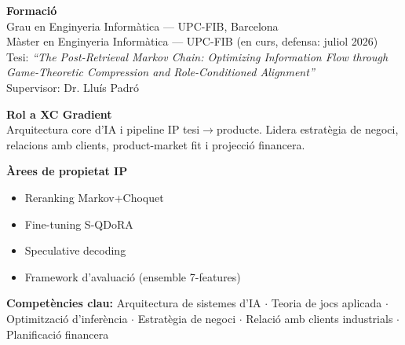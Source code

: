 \documentclass[11pt,a4paper]{article}
\begin{document}
\begin{profilebox}[title={\large\bfseries\color{dark} Oriol Farrés i Vilar \hfill \normalsize CEO / CFO}]

\begin{minipage}[t]{0.65\textwidth}
\textbf{Formació}\\
Grau en Enginyeria Informàtica --- UPC-FIB, Barcelona\\
Màster en Enginyeria Informàtica --- UPC-FIB (en curs, defensa: juliol 2026)\\
\small Tesi: \textit{``The Post-Retrieval Markov Chain: Optimizing Information Flow through Game-Theoretic Compression and Role-Conditioned Alignment''}\\
Supervisor: Dr. Lluís Padró

\vspace{0.5em}
\textbf{Rol a XC Gradient}\\
Arquitectura core d'IA i pipeline IP tesi$\rightarrow$producte. Lidera estratègia de negoci, relacions amb clients, product-market fit i projecció financera.
\end{minipage}%
\hfill%
\begin{minipage}[t]{0.32\textwidth}
\small
\textbf{Àrees de propietat IP}
\begin{itemize}[leftmargin=0.8em,itemsep=1pt,topsep=2pt]
\item Reranking Markov+Choquet
\item Fine-tuning S-QDoRA
\item Speculative decoding
\item Framework d'avaluació (ensemble 7-features)
\end{itemize}
\end{minipage}

\vspace{0.5em}
\begin{skillbox}
\small\textbf{Competències clau:} Arquitectura de sistemes d'IA $\cdot$ Teoria de jocs aplicada $\cdot$ Optimització d'inferència $\cdot$ Estratègia de negoci $\cdot$ Relació amb clients industrials $\cdot$ Planificació financera
\end{skillbox}


\end{profilebox}
\end{document}
